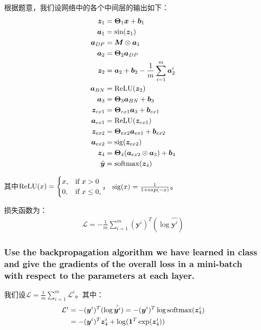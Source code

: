 \documentclass[12pt, a4paper]{article}
\newcommand{\imat}{\bm}
\newcommand{\ivec}{\bm}
\newcommand{\softmax}{{\rm softmax}}
\newcommand{\sigmoid}{{\rm sig}}
\newcommand{\relu}{{\rm ReLU}}
\newcommand{\loss}{\mathcal{L}}
\newcommand{\thetam}{\imat{\Theta}}
\newcommand{\av}{\ivec{a}}
\newcommand{\bv}{\ivec{b}}
\newcommand{\xv}{\ivec{x}}
\newcommand{\yv}{\ivec{y}}
\newcommand{\zv}{\ivec{z}}
\begin{document}
        根据题意，我们设网络中的各个中间层的输出如下：
        \begin{align*}
        \zv_1 &= \thetam_1 \xv + \bv_1 \\
        \av_1 &= \sin(\zv_1) \\
        \av_{DP} &= \ivec{M} \otimes \av_1 \\
        \av_2 &= \thetam_2 \av_{DP} \\
        \zv_2 &= \av_2 + \bv_2 - \frac{1}{m} \sum_{i=1}^{m} \av_2^i\\
        \av_{BN} &= \relu(\zv_2) \\
        \av_3 &= \thetam_3 \av_{BN} + \bv_3 \\
        \zv_{ex1} &= \thetam_{ex1} \av_3 + \bv_{ex1} \\
        \av_{ex1} &= \relu(\zv_{ex1}) \\
        \zv_{ex2} &= \thetam_{ex2} \av_{ex1} + \bv_{ex2} \\
        \av_{ex2} &= \sigmoid(\zv_{ex2}) \\
        \zv_4 &= \thetam_4 (\av_{ex2} \otimes \av_3) + \bv_4 \\
        \hat{\yv} &= \softmax(\zv_4)
        \end{align*}

        其中$\relu(x) = \begin{cases}
                        x, &\text{if $x > 0$} \\
                        0, &\text{if $x \le 0$,}
                        \end{cases}$，
            $\sigmoid(x) = \frac{1}{1 + \exp(-x)}$。

        损失函数为：
        \begin{equation}\begin{aligned}
        \loss = -\frac{1}{m} \sum_{i=1}^{m} (\yv^{i})^{T} (\log{\hat{\yv^i}})
        \end{aligned}\end{equation}

    \subsubsection{Use the backpropagation algorithm we have learned in class and give the gradients of the overall loss in a mini-batch with respect to the parameters at each layer.}

        我们设$\loss = \frac{1}{m} \sum_{i=1}^{m} \loss^i$。其中：
        \begin{align*}
        \loss^i
        &= - (\yv^i)^{T} (\log{\hat{\yv^i}}) = - (\yv^i)^{T} \log{\softmax(\zv_4^i)} \\
        &= - (\yv^i)^{T} \zv_4^i + \log(\ivec{1}^T \exp(\zv_4^i))
        \end{align*}
\end{document}
